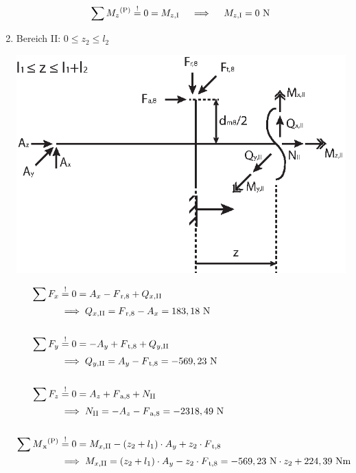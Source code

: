\begin{enumerate}
\begin{align*}
        \sum M_z \textsuperscript{(P)}&\overset{!}{=} 0 = M_{z,\mathrm{I}}  \quad \implies \quad   M_{z,\mathrm{I}} = 0 \text{ N} \\ 
    \end{align*}
\newpage
\item Bereich II: $0 \leq z_2 \leq l_2$
\begin{center}
	\includegraphics{figures/Bereich_2}
\end{center}
			\begin{align*}
        \sum F_x &\overset{!}{=} 0 = A_x -F\textsubscript{r,8} + Q_{x,\mathrm{II}} \\
				&\implies  Q_{x,\mathrm{II}} = F\textsubscript{r,8} -A_x =183,18 \text{ N}\\ \\
       \sum F_y &\overset{!}{=} 0 = -A_y +F\textsubscript{t,8} + Q_{y,\mathrm{II}} \\
       		&\implies  Q_{y,\mathrm{II}} = A_y - F\textsubscript{t,8} =-569,23 \text{ N}\\ \\
       	\sum F_z &\overset{!}{=} 0 = A_z +F\textsubscript{a,8} + N_{\mathrm{II}} \\
       		&\implies  N_{\mathrm{II}} = -A_z - F\textsubscript{a,8} = -2318,49 \text{ N}\\ \\
        \sum M\textsubscript{x}\textsuperscript{(P)} &\overset{!}{=} 0 = M_{x,\mathrm{II}} - (z_2+l_1) \x A_y +z_2 \x F\textsubscript{t,8} \\
				&\implies M_{x,\mathrm{II}} = (z_2+l_1) \x A_y - z_2 \x F\textsubscript{t,8} =  -569,23 \text{ N} \x z_2 + 224,39 \text{ Nm}\\ \\

\end{align*}
\end{enumerate}
